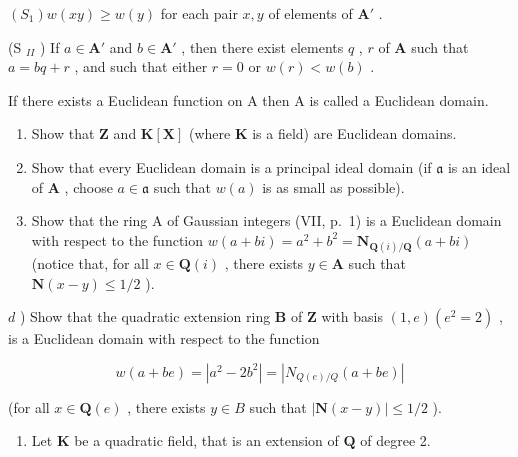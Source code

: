 \((S_{1}) w(xy) \geqslant w(y)\) for each pair \(x, y\) of elements of \(\mathbf{A}'\) .

(S \(_{II}\) ) If \(a \in \mathbf{A}'\) and \(b \in \mathbf{A}'\) , then there exist elements \(q\) , \(r\) of \(\mathbf{A}\) such that \(a = bq + r\) , and such that either \(r = 0\) or \(w(r) < w(b)\) .

If there exists a Euclidean function on A then A is called a Euclidean domain.

\begin{enumerate}
\def\labelenumi{\alph{enumi})}
\item
  Show that \(\mathbf{Z}\) and \(\mathbf{K}[\mathbf{X}]\) (where \(\mathbf{K}\) is a field) are Euclidean domains.
\item
  Show that every Euclidean domain is a principal ideal domain (if \(\mathfrak{a}\) is an ideal of \(\mathbf{A}\) , choose \(a \in \mathfrak{a}\) such that \(w(a)\) is as small as possible).
\item
  Show that the ring A of Gaussian integers (VII, p.~1) is a Euclidean domain with respect to the function \(w(a + bi) = a^2 + b^2 = \mathbf{N}_{\mathbf{Q}(i) / \mathbf{Q}}(a + bi)\) (notice that, for all \(x \in \mathbf{Q}(i)\) , there exists \(y \in \mathbf{A}\) such that \(\mathbf{N}(x - y) \leqslant 1/2\) ).
\end{enumerate}

\(d\) ) Show that the quadratic extension ring \(\mathbf{B}\) of \(\mathbf{Z}\) with basis \((1,e)(e^2 = 2)\) , is a Euclidean domain with respect to the function

\[
w (a + b e) = \left| a ^ {2} - 2 b ^ {2} \right| = \left| N _ {Q (e) / Q} (a + b e) \right|
\]

(for all \(x \in \mathbf{Q}(e)\) , there exists \(y \in B\) such that \(|\mathbf{N}(x - y)| \leqslant 1/2\) ).

\begin{enumerate}
\def\labelenumi{\arabic{enumi})}
\setcounter{enumi}{7}
\tightlist
\item
  Let \(\mathbf{K}\) be a quadratic field, that is an extension of \(\mathbf{Q}\) of degree 2.
\end{enumerate}

